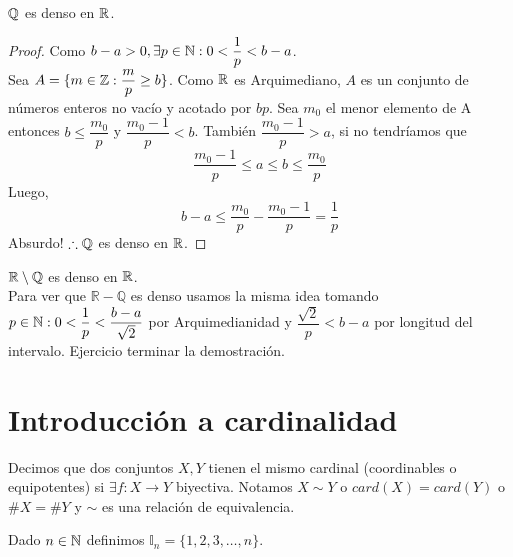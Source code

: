 \begin{eg}
    \(\mathbb{Q} \) es denso en \(\mathbb{R} \).
    \begin{proof}
        Como \(b-a>0, \exists p\in \mathbb{N}: 0 < \dfrac{1}{p}<b-a\). \\
        Sea \(A = \{ m \in \mathbb{Z}: \dfrac{m}{p} \geq b \} \). Como \(\mathbb{R} \) es Arquimediano, \(A\) es un conjunto de números enteros no vacío y acotado por \(bp\). Sea \(m_0\) el menor elemento de A entonces \(b\leq \dfrac{m_0}{p} \) y \(\dfrac{m_0-1}{p} <b\). También \(\dfrac{m_0-1}{p} > a\), si no tendríamos que
        \begin{equation*}
            \dfrac{m_0-1}{p} \leq a \leq b \leq \dfrac{m_0}{p}
        \end{equation*}
        Luego,
        \begin{equation*}
            b-a \leq \dfrac{m_0}{p} - \dfrac{m_0-1}{p} = \dfrac1p
        \end{equation*}
        Absurdo! \(\therefore \mathbb{Q} \) es denso en \(\mathbb{R} \).
    \end{proof}
\end{eg}

\begin{eg}
    \(\mathbb{R} \setminus \mathbb{Q} \) es denso en \(\mathbb{R} \). \\
    Para ver que \(\mathbb{R-Q} \) es denso usamos la misma idea tomando \(p \in \mathbb{N} :0<\dfrac1p<\dfrac{b-a}{\sqrt2} \) por Arquimedianidad y \(\dfrac{\sqrt2}{p} < b-a\) por longitud del intervalo.
    Ejercicio terminar la demostración.
\end{eg}

\section{Introducción a cardinalidad}

\begin{definition}
    Decimos que dos conjuntos \(X, Y\) tienen el mismo cardinal (coordinables o equipotentes) si \(\exists f: X \to Y\) biyectiva. Notamos \(X \sim Y\) o \(card(X) = card(Y)\) o \( \#X=\#Y\) y \(\sim \) es una relación de equivalencia.
\end{definition}

Dado \(n \in \mathbb{N} \) definimos \(\mathbb{I}_n = \{1, 2, 3,\ldots, n\} \).

